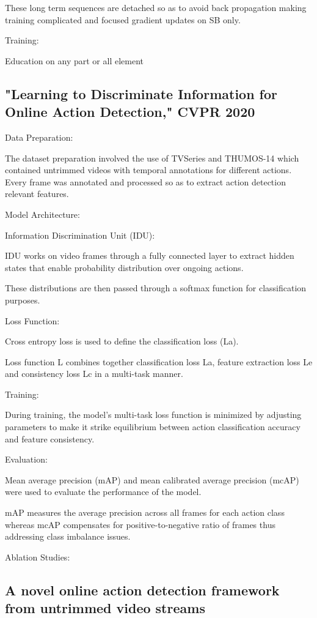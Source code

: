 {These long term sequences are detached so as to avoid back propagation making training complicated and focused gradient updates on SB only.

Training:

Education on any part or all element


\subsection{ "Learning to Discriminate Information for Online Action Detection," CVPR 2020
}

Data Preparation:

The dataset preparation involved the use of TVSeries and THUMOS-14 which contained untrimmed videos with temporal annotations for different actions. Every frame was annotated and processed so as to extract action detection relevant features.

Model Architecture:

Information Discrimination Unit (IDU):

IDU works on video frames through a fully connected layer to extract hidden states that enable probability distribution over ongoing actions.

These distributions are then passed through a softmax function for classification purposes.

Loss Function:

Cross entropy loss is used to define the classification loss (La).

Loss function L combines together classification loss La, feature extraction loss Le and consistency loss Lc in a multi-task manner.

Training:

During training, the model’s multi-task loss function is minimized by adjusting parameters to make it strike equilibrium between action classification accuracy and feature consistency.

Evaluation:

Mean average precision (mAP) and mean calibrated average precision (mcAP) were used to evaluate the performance of the model.

mAP measures the average precision across all frames for each action class whereas mcAP compensates for positive-to-negative ratio of frames thus addressing class imbalance issues.

Ablation Studies:


\subsection{ A novel online action detection framework from untrimmed video
streams}

}

